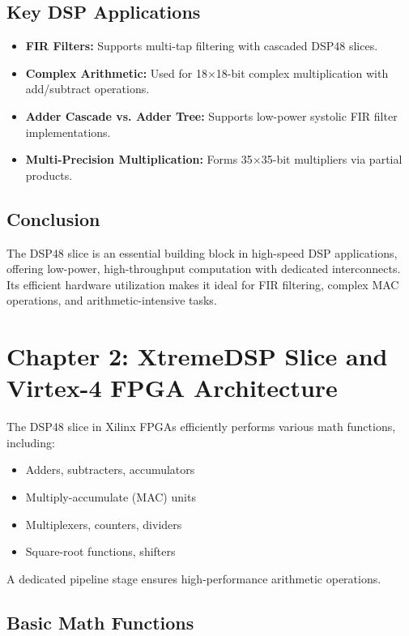 \documentclass{article}
\begin{document}
	\subsection{Key DSP Applications}
	\begin{itemize}
		\item \textbf{FIR Filters:} Supports multi-tap filtering with cascaded DSP48 slices.
		\item \textbf{Complex Arithmetic:} Used for 18×18-bit complex multiplication with add/subtract operations.
		\item \textbf{Adder Cascade vs. Adder Tree:} Supports low-power systolic FIR filter implementations.
		\item \textbf{Multi-Precision Multiplication:} Forms 35×35-bit multipliers via partial products.
	\end{itemize}
	
	\subsection{Conclusion}
	The DSP48 slice is an essential building block in high-speed DSP applications, offering low-power, high-throughput computation with dedicated interconnects. Its efficient hardware utilization makes it ideal for FIR filtering, complex MAC operations, and arithmetic-intensive tasks.
	
	
	\section{Chapter 2: XtremeDSP Slice and Virtex-4 FPGA Architecture}
	The DSP48 slice in Xilinx FPGAs efficiently performs various math functions, including:
	\begin{itemize}
		\item Adders, subtracters, accumulators
		\item Multiply-accumulate (MAC) units
		\item Multiplexers, counters, dividers
		\item Square-root functions, shifters
	\end{itemize}
	A dedicated pipeline stage ensures high-performance arithmetic operations.
	
	\subsection{Basic Math Functions}
	
\end{document}
